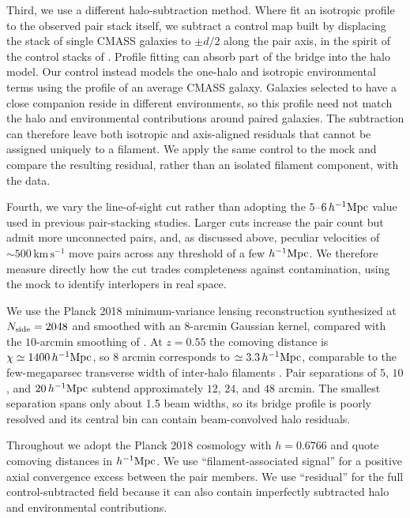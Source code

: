 \documentclass[preprint]{aastex701}
\newcommand{\hinvMpc}{h^{-1}{\rm Mpc}}
\begin{document}
Third, we use a different halo-subtraction method. Where
\citet{deGraaff2019} fit an isotropic profile to the observed pair stack
itself, we subtract a control map built by displacing the stack of single
CMASS galaxies to $\pm d/2$ along the pair axis, in the spirit of the control
stacks of \citet{EppsHudson2017}. Profile fitting can absorb part of the
bridge into the halo model. Our control instead models the one-halo and
isotropic environmental terms using the profile of an average CMASS galaxy.
Galaxies selected to have a close companion reside in different environments,
so this profile need not match the halo and environmental contributions
around paired galaxies. The subtraction can therefore leave both isotropic
and axis-aligned residuals that cannot be assigned uniquely to a filament.
We apply the same control to the mock and compare the resulting residual,
rather than an isolated filament component, with the data.

Fourth, we vary the line-of-sight cut rather than adopting the
$5$--$6\,\hinvMpc$ value used in previous pair-stacking studies. Larger cuts
increase the pair count but admit more unconnected pairs, and, as discussed
above, peculiar velocities of $\sim500\,\mathrm{km\,s^{-1}}$ move pairs across
any threshold of a few $\hinvMpc$. We therefore measure directly how the cut
trades completeness against contamination, using the mock to identify
interlopers in real space.

We use the Planck 2018 minimum-variance lensing reconstruction
\citep{Planck2018lensing} synthesized at $N_{\rm side}=2048$ and smoothed with
an $8$-arcmin Gaussian kernel, compared with the $10$-arcmin smoothing of
\citet{deGraaff2019}. At $z=0.55$ the comoving distance is
$\chi\simeq1400\,\hinvMpc$, so $8$ arcmin corresponds to $\simeq3.3\,\hinvMpc$,
comparable to the few-megaparsec transverse width of inter-halo filaments
\citep{Colberg2005}. Pair separations of $5$, $10$, and $20\,\hinvMpc$ subtend
approximately $12$, $24$, and $48$ arcmin. The smallest separation spans only
about 1.5 beam widths, so its bridge profile is poorly resolved and its
central bin can contain beam-convolved halo residuals.

Throughout we adopt the Planck 2018 cosmology with $h=0.6766$ and quote
comoving distances in $\hinvMpc$. We use ``filament-associated signal'' for a
positive axial convergence excess between the pair members. We use
``residual'' for the full control-subtracted field because it can also contain
imperfectly subtracted halo and environmental contributions.
\end{document}
